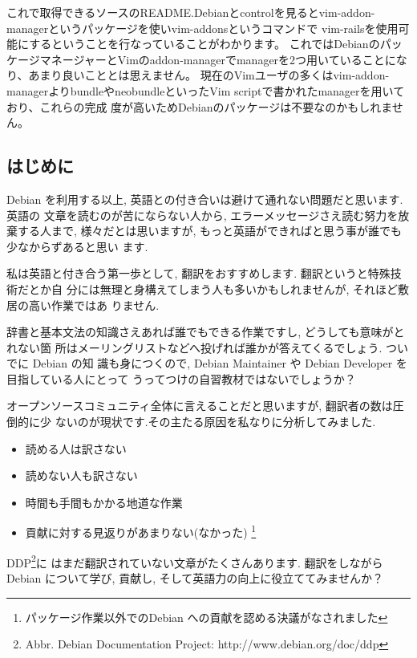 \documentclass[mingoth,a4paper]{jsarticle}
\begin{document}

これで取得できるソースのREADME.Debianとcontrolを見るとvim-addon-managerというパッケージを使いvim-addonsというコマンドで
vim-railsを使用可能にするということを行なっていることがわかります。
これではDebianのパッケージマネージャーとVimのaddon-managerでmanagerを2つ用いていることになり、あまり良いこととは思えません。
現在のVimユーザの多くはvim-addon-managerよりbundleやneobundleといったVim scriptで書かれたmanagerを用いており、これらの完成
度が高いためDebianのパッケージは不要なのかもしれません。


\clearpage

\subsection{はじめに}
Debian を利用する以上, 英語との付き合いは避けて通れない問題だと思います. 英語の
文章を読むのが苦にならない人から, エラーメッセージさえ読む努力を放棄する人まで, 
様々だとは思いますが, もっと英語ができればと思う事が誰でも少なからずあると思い
ます.

私は英語と付き合う第一歩として, 翻訳をおすすめします. 翻訳というと特殊技術だとか自
分には無理と身構えてしまう人も多いかもしれませんが, それほど敷居の高い作業ではあ
りません.

辞書と基本文法の知識さえあれば誰でもできる作業ですし, どうしても意味がとれない箇
所はメーリングリストなどへ投げれば誰かが答えてくるでしょう. ついでに Debian の知
識も身につくので, Debian Maintainer や Debian Developer を目指している人にとって
うってつけの自習教材ではないでしょうか？

オープンソースコミュニティ全体に言えることだと思いますが, 翻訳者の数は圧倒的に少
ないのが現状です.その主たる原因を私なりに分析してみました. 
\begin{itemize}
	\item 読める人は訳さない
	\item 読めない人も訳さない
	\item 時間も手間もかかる地道な作業
	\item 貢献に対する見返りがあまりない(なかった)
	\footnote{パッケージ作業以外でのDebian への貢献を認める決議がなされました}
\end{itemize}

DDP\footnote{Abbr. Debian Documentation Project: http://www.debian.org/doc/ddp}に
はまだ翻訳されていない文章がたくさんあります. 翻訳をしながら Debian について学び,
 貢献し, そして英語力の向上に役立ててみませんか？
\end{document}
